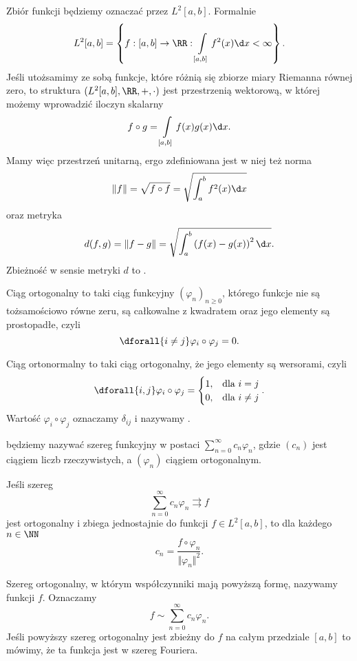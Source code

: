 Zbiór funkcji  będziemy oznaczać przez $L^2[a, b]$. Formalnie
\[ L^2[a, b] = \left\{f: [a, b] \to \RR : \int\limits_{[a, b]} f^2(x) \d x < \infty \right\}. \]
Jeśli utożsamimy ze sobą funkcje, które różnią się zbiorze miary Riemanna równej zero, to struktura $(L^2[a, b], \RR, +, \cdot)$ jest przestrzenią wektorową, w której możemy wprowadzić iloczyn skalarny
\[ f \circ g = \int\limits_{[a, b]} f(x)g(x) \d x. \]
Mamy więc przestrzeń unitarną, ergo zdefiniowana jest w niej też norma
\[ \Vert f \Vert = \sqrt{f \circ f} = \sqrt{\int_a^b f^2(x) \d x} \]
oraz metryka
\[ d(f, g) = \Vert f - g \Vert = \sqrt{\int_a^b \left(f(x) - g(x)\right)^2 \d x}. \]
Zbieżność w sensie metryki $d$ to .

\begin{definition}
    Ciąg ortogonalny to taki ciąg funkcyjny $(\varphi_n)_{n\geq 0}$, którego funkcje nie są tożsamościowo równe zeru, są całkowalne z kwadratem oraz jego elementy są prostopadłe, czyli
    \[ \dforall{i \neq j} \varphi_i \circ \varphi_j = 0. \]
\end{definition}

\begin{definition}
    Ciąg ortonormalny to taki ciąg ortogonalny, że jego elementy są wersorami, czyli
    \[ \dforall{i, j} \varphi_i \circ \varphi_j = \begin{cases}1, & \text{dla } i = j \\ 0, & \text{dla } i \neq j\end{cases}. \]
    Wartość $\varphi_i \circ \varphi_j$ oznaczamy $\delta_{ij}$ i nazywamy .
\end{definition}

 będziemy nazywać szereg funkcyjny w postaci $\sum_{n=0}^\infty c_n\varphi_n$, gdzie $(c_n)$ jest ciągiem liczb rzeczywistych, a $(\varphi_n)$ ciągiem ortogonalnym.

\begin{theorem}
    \label{t:Euler-Fourier}
    Jeśli szereg
    \[ \sum_{n=0}^\infty c_n\varphi_n \rightrightarrows f \]
    jest ortogonalny i zbiega jednostajnie do funkcji $f \in L^2[a, b]$, to dla każdego $n \in \NN$
    \[ c_n = \frac{f \circ \varphi_n}{\Vert \varphi_n \Vert^2}. \]
\end{theorem}

Szereg ortogonalny, w którym współczynniki mają powyższą formę, nazywamy  funkcji $f$. Oznaczamy
\[ f \sim \sum_{n=0}^\infty c_n\varphi_n. \]
Jeśli powyższy szereg ortogonalny jest zbieżny do $f$ na całym przedziale $[a, b]$ to mówimy, że ta funkcja jest  w szereg Fouriera.

